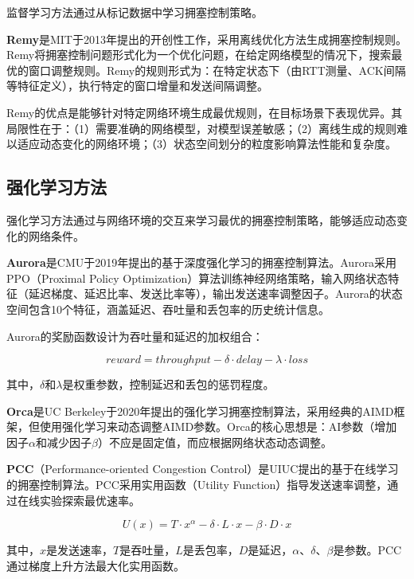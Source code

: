 监督学习方法通过从标记数据中学习拥塞控制策略。

\textbf{Remy}是MIT于2013年提出的开创性工作，采用离线优化方法生成拥塞控制规则。Remy将拥塞控制问题形式化为一个优化问题，在给定网络模型的情况下，搜索最优的窗口调整规则。Remy的规则形式为：在特定状态下（由RTT测量、ACK间隔等特征定义），执行特定的窗口增量和发送间隔调整。

Remy的优点是能够针对特定网络环境生成最优规则，在目标场景下表现优异。其局限性在于：（1）需要准确的网络模型，对模型误差敏感；（2）离线生成的规则难以适应动态变化的网络环境；（3）状态空间划分的粒度影响算法性能和复杂度。

\subsection{强化学习方法}

强化学习方法通过与网络环境的交互来学习最优的拥塞控制策略，能够适应动态变化的网络条件。

\textbf{Aurora}是CMU于2019年提出的基于深度强化学习的拥塞控制算法。Aurora采用PPO（Proximal Policy Optimization）算法训练神经网络策略，输入网络状态特征（延迟梯度、延迟比率、发送比率等），输出发送速率调整因子。Aurora的状态空间包含10个特征，涵盖延迟、吞吐量和丢包率的历史统计信息。

Aurora的奖励函数设计为吞吐量和延迟的加权组合：

\begin{equation}
reward = throughput - \delta \cdot delay - \lambda \cdot loss
\end{equation}

其中，$\delta$和$\lambda$是权重参数，控制延迟和丢包的惩罚程度。

\textbf{Orca}是UC Berkeley于2020年提出的强化学习拥塞控制算法，采用经典的AIMD框架，但使用强化学习来动态调整AIMD参数。Orca的核心思想是：AI参数（增加因子$\alpha$和减少因子$\beta$）不应是固定值，而应根据网络状态动态调整。

\textbf{PCC}（Performance-oriented Congestion Control）是UIUC提出的基于在线学习的拥塞控制算法。PCC采用实用函数（Utility Function）指导发送速率调整，通过在线实验探索最优速率。

\begin{equation}
U(x) = T \cdot x^{\alpha} - \delta \cdot L \cdot x - \beta \cdot D \cdot x
\end{equation}

其中，$x$是发送速率，$T$是吞吐量，$L$是丢包率，$D$是延迟，$\alpha$、$\delta$、$\beta$是参数。PCC通过梯度上升方法最大化实用函数。

